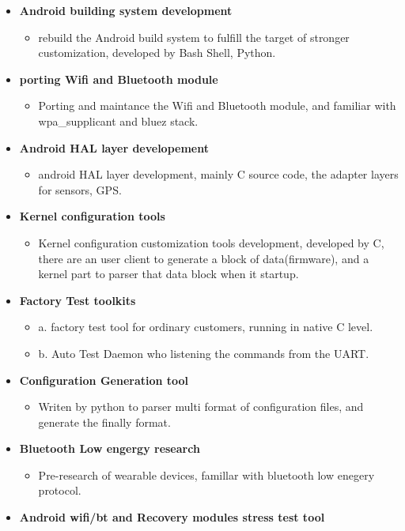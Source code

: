\documentclass[a4paper, 10pt, titlepage]{article}
\begin{document}
\begin{itemize}

\item \textbf{Android building system development}
  \begin{itemize}
    \item rebuild the Android build system to fulfill the target of stronger customization, developed by Bash Shell, Python.
  \end{itemize}

\item \textbf{porting Wifi and Bluetooth module}
  \begin{itemize}
    \item Porting and maintance the Wifi and Bluetooth module, and familiar with wpa\_supplicant and bluez stack.
  \end{itemize}

\item \textbf{Android HAL layer developement}
  \begin{itemize}
    \item android HAL layer development, mainly C source code, the adapter layers for sensors, GPS.
  \end{itemize}

\item \textbf{Kernel configuration tools}
  \begin{itemize}
    \item Kernel configuration customization tools development, developed by C, there are an user client to generate a block of data(firmware), and a kernel part to parser that data block when it startup.
  \end{itemize}

\item \textbf{Factory Test toolkits}
  \begin{itemize}
    \item a. factory test tool for ordinary customers, running in native C level. \newline{}
    \item b. Auto Test Daemon who listening the commands from the UART. 
  \end{itemize}

\item \textbf{Configuration Generation tool}
  \begin{itemize}
    \item Writen by python to parser multi format of configuration files, and generate the finally format.
  \end{itemize}

\item \textbf{Bluetooth Low engergy research}
  \begin{itemize}
    \item Pre-research of wearable devices, famillar with bluetooth low enegery protocol.
  \end{itemize}

\item \textbf{Android wifi/bt and Recovery modules stress test tool}

\end{itemize}
\end{document}
